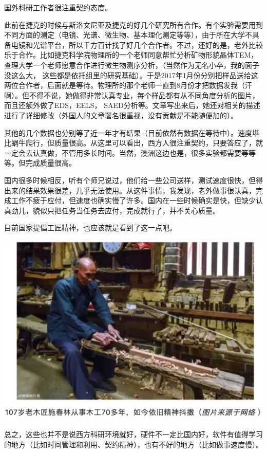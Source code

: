 \documentclass[]{book}
\begin{document}
国外科研工作者很注重契约态度。

此前在捷克的时候与斯洛文尼亚及捷克的好几个研究所有合作。有个实验需要用到不同方面的测定（电镜、光谱、微生物、基本理化测定等等），由于所在大学不具备电镜和光谱平台，所以千方百计找了好几个合作者。不过，还好的是，老外比较乐于合作。比如捷克科学院物理所的一个老师同意帮忙分析矿物形貌晶体TEM，查理大学一个老师愿意合作进行微生物测序分析，（当然作为无名小卒，我的面子没这么大， 这些都是依托组里的研究基础）。于是2017年1月份分别把样品送给这两位合作者，后面就是等待。物理所的那个老师一直到8月份才把数据发我（汗啊）。但不得不说，她做得非常认真专业，每个样品都有从不同角度分析的图片，而且还额外做了EDS，EELS， SAED分析等。文章写出来后，她还对相关的描述进行了详细修改（外国人的文章署名很重视，没有贡献是不能随便加的）。

其他的几个数据也分别等了近一年才有结果（目前依然有数据在等待中）。速度堪比蜗牛爬行，但质量很高。从这里可以看出，西方人很注重契约，只要答应了，就一定会去认真做，不管用多长时间。当然，澳洲这边也是，很多实验都需要等等等。但完成质量很高。

国内很多时候相反，听有个师兄说过，他们给一些公司送样，测试速度很快，但得出来的结果效果很差，几乎无法使用。从这件事情，我发现，老外做事很认真，完成工作不疲于应付，但速度也确实慢了许多。国内在一些时候确实是快，但缺少认真劲儿，貌似只把任务当任务去应付，完成就行了，并不关心质量。

目前国家提倡工匠精神，也应该就是看到了这一点吧。

\includegraphics[width=8.33in]{images/osre5}

总之，这些也并不是说西方科研环境就好，硬件不一定比国内好，软件有值得学习的地方（比如时间管理和利用、契约精神），也有不好的地方（比如做事速度慢）。
\end{document}

